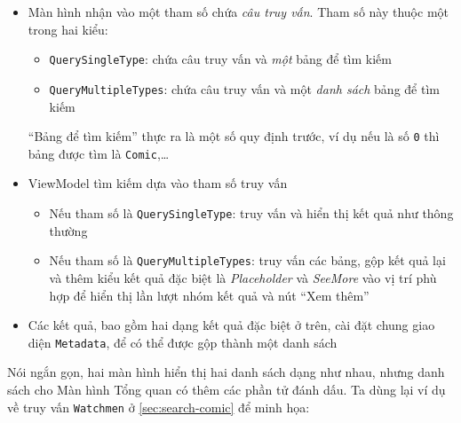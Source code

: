 \documentclass[../../../../thesis]{subfiles}
\begin{document}
\begin{itemize}
    \item
        Màn hình nhận vào một tham số chứa \emph{câu truy vấn}. Tham số này
        thuộc một trong hai kiểu:

        \begin{itemize}
            \item
                \texttt{QuerySingleType}: chứa câu truy vấn và \emph{một} bảng
                để tìm kiếm
            \item
                \texttt{QueryMultipleTypes}: chứa câu truy vấn và một \emph{danh
                sách} bảng để tìm kiếm
        \end{itemize}

        ``Bảng để tìm kiếm'' thực ra là một số quy định trước, ví dụ nếu là số
        \texttt{0} thì bảng được tìm là \texttt{Comic},\ldots{}
    \item
        ViewModel tìm kiếm dựa vào tham số truy vấn

        \begin{itemize}
            \item
                Nếu tham số là \texttt{QuerySingleType}: truy vấn và hiển thị
                kết quả như thông thường
            \item
                Nếu tham số là \texttt{QueryMultipleTypes}: truy vấn các bảng,
                gộp kết quả lại và thêm kiểu kết quả đặc biệt là
                \emph{Placeholder} và \emph{SeeMore} vào vị trí phù hợp để hiển
                thị lần lượt nhóm kết quả và nút ``Xem thêm''
        \end{itemize}
    \item
        Các kết quả, bao gồm hai dạng kết quả đặc biệt ở trên, cài đặt chung
        giao diện \texttt{Metadata}, để có thể được gộp thành một danh sách
\end{itemize}

Nói ngắn gọn, hai màn hình hiển thị hai danh sách dạng như nhau, nhưng danh sách
cho Màn hình Tổng quan có thêm các phần tử đánh dấu. Ta dùng lại ví dụ về truy
vấn \texttt{Watchmen} ở \autoref{sec:search-comic} để minh họa:
\end{document}
